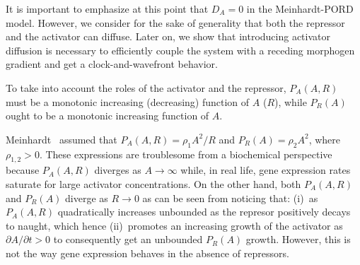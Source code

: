 \documentclass[%
 preprint,
 aip, 
 amsmath,amssymb,
]{revtex4-2}
\begin{document}
It is important to emphasize at this point that $D_A = 0$ in the Meinhardt-PORD model. However, we consider for the sake of generality that both the repressor and the activator can diffuse. Later on, we show that introducing activator diffusion is necessary to efficiently couple the system with a receding morphogen gradient and get a clock-and-wavefront behavior.
	
To take into account the roles of the activator and the repressor, $P_A(A, R)$ must be a monotonic increasing (decreasing) function of $A$ ($R$), while $P_R(A)$ ought to be a monotonic increasing function of $A$. 

Meinhardt~\cite{Meinhardt1982} assumed that $P_A(A, R) = \displaystyle \rho_1 A^2/R$ and $P_R(A) = \rho_2 A^2$, where $\rho_{1,2}>0$.
These expressions are troublesome from a biochemical perspective because $P_A(A, R)$ diverges as $A \to \infty$ while, in real life, gene expression rates saturate for large activator concentrations. On the other hand, both $P_A(A, R)$ and $P_R(A)$ diverge as $R \to 0$ as can be seen from noticing that: (i)~as $P_A(A,R)$ quadratically increases unbounded as the represor positively decays to naught, which hence (ii)~promotes an increasing growth of the activator as $\partial A/\partial t>0$ to consequently get an unbounded $P_R(A)$ growth. However, this is not the way gene expression behaves in the absence of repressors.
\end{document}

